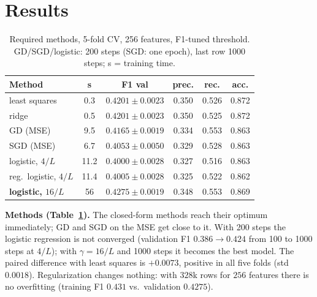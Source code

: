 \documentclass[10pt,conference,compsocconf]{IEEEtran}
\begin{document}
\section{Results}

\begin{table}[t]
\centering\footnotesize\setlength{\tabcolsep}{3pt}
\caption{Required methods, 5-fold CV, 256 features, F1-tuned threshold. GD/SGD/logistic: 200 steps (SGD: one epoch), last row 1000 steps; s = training time.}
\label{tab:methods}
\begin{tabular}{lccccc}
\toprule
Method & s & F1 val & prec. & rec. & acc. \\
\midrule
least squares        & 0.3  & $0.4201\pm0.0023$ & 0.350 & 0.526 & 0.872 \\
ridge & 0.5  & $0.4201\pm0.0023$ & 0.350 & 0.525 & 0.872 \\
GD (MSE)    & 9.5  & $0.4165\pm0.0019$ & 0.334 & 0.553 & 0.863 \\
SGD (MSE)   & 6.7  & $0.4053\pm0.0050$ & 0.329 & 0.528 & 0.863 \\
logistic, $4/L$ & 11.2 & $0.4000\pm0.0028$ & 0.327 & 0.516 & 0.863 \\
reg.\ logistic, $4/L$ & 11.4 & $0.4005\pm0.0028$ & 0.325 & 0.522 & 0.862 \\
\textbf{logistic, $16/L$} & 56 & $\mathbf{0.4275\pm0.0019}$ & 0.348 & 0.553 & 0.869 \\
\bottomrule
\end{tabular}
\end{table}



\textbf{Methods (Table~\ref{tab:methods}).} The closed-form methods reach their optimum immediately; GD and SGD on the MSE get close to it. With 200 steps the logistic regression is not converged (validation F1 $0.386\to0.424$ from 100 to 1000 steps at $4/L$); with $\gamma=16/L$ and 1000 steps it becomes the best model. The paired difference with least squares is $+0.0073$, positive in all five folds (std $0.0018$). Regularization changes nothing: with $328$k rows for $256$ features there is no overfitting (training F1 $0.431$ vs.\ validation $0.4275$).
\end{document}

